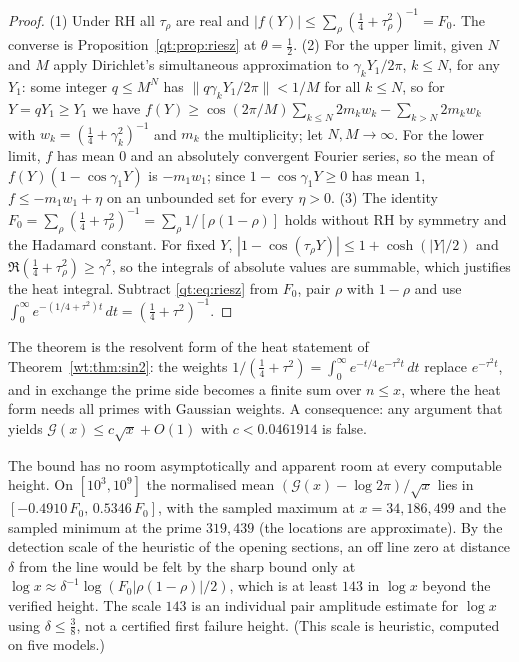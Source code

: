 \begin{proof}
(1) Under RH all $\tau_\rho$ are real and $|f(Y)|\le\sum_\rho(\tfrac14+\tau_\rho^2)^{-1}=F_0$. The converse is Proposition~\ref{qt:prop:riesz} at $\theta=\tfrac12$. (2) For the upper limit, given $N$ and $M$ apply Dirichlet's simultaneous approximation to $\gamma_kY_1/2\pi$, $k\le N$, for any $Y_1$: some integer $q\le M^N$ has $\|q\gamma_kY_1/2\pi\|<1/M$ for all $k\le N$, so for $Y=qY_1\ge Y_1$ we have $f(Y)\ge\cos(2\pi/M)\sum_{k\le N}2m_kw_k-\sum_{k>N}2m_kw_k$ with $w_k=(\tfrac14+\gamma_k^2)^{-1}$ and $m_k$ the multiplicity; let $N,M\to\infty$. For the lower limit, $f$ has mean $0$ and an absolutely convergent Fourier series, so the mean of $f(Y)(1-\cos\gamma_1Y)$ is $-m_1w_1$; since $1-\cos\gamma_1Y\ge0$ has mean $1$, $f\le-m_1w_1+\eta$ on an unbounded set for every $\eta>0$. (3) The identity $F_0=\sum_\rho(\tfrac14+\tau_\rho^2)^{-1}=\sum_\rho1/[\rho(1-\rho)]$ holds without RH by symmetry and the Hadamard constant. For fixed $Y$, $|1-\cos(\tau_\rho Y)|\le1+\cosh(|Y|/2)$ and $\Re(\tfrac14+\tau_\rho^2)\ge\gamma^2$, so the integrals of absolute values are summable, which justifies the heat integral. Subtract \eqref{qt:eq:riesz} from $F_0$, pair $\rho$ with $1-\rho$ and use $\int_0^\infty e^{-(1/4+\tau^2)t}\,dt=(\tfrac14+\tau^2)^{-1}$.
\end{proof}

The theorem is the resolvent form of the heat statement of Theorem~\ref{wt:thm:sin2}: the weights $1/(\tfrac14+\tau^2)=\int_0^\infty e^{-t/4}e^{-\tau^2t}\,dt$ replace $e^{-\tau^2t}$, and in exchange the prime side becomes a finite sum over $n\le x$, where the heat form needs all primes with Gaussian weights. A consequence: any argument that yields $\mathcal G(x)\le c\sqrt x+O(1)$ with $c<0.0461914$ is false.

The bound has no room asymptotically and apparent room at every computable height. On $[10^3,10^9]$ the normalised mean $(\mathcal G(x)-\log2\pi)/\sqrt x$ lies in $[-0.4910\,F_0,\,0.5346\,F_0]$, with the sampled maximum at $x=34{,}186{,}499$ and the sampled minimum at the prime $319{,}439$ (the locations are approximate). By the detection scale of the heuristic of the opening sections, an off line zero at distance $\delta$ from the line would be felt by the sharp bound only at $\log x\approx\delta^{-1}\log(F_0|\rho(1-\rho)|/2)$, which is at least $143$ in $\log x$ beyond the verified height. The scale $143$ is an individual pair amplitude estimate for $\log x$ using $\delta\le\tfrac38$, not a certified first failure height. (This scale is heuristic, computed on five models.)

